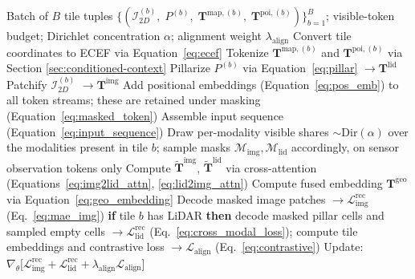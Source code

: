 \documentclass{book}
\begin{document}
\begin{algorithm}[H]
  \caption{GFM Pre-training Step (single batch)}
  \label{alg:pretraining}
  \begin{algorithmic}[1]
    \Require Batch of $B$ tile tuples
      $\{(\mathcal{I}^{(b)}_{2D},\;
          P^{(b)},\;
          \mathbf{T}^{\text{map},(b)},\;
          \mathbf{T}^{\text{poi},(b)})\}_{b=1}^B$;
      visible-token budget; Dirichlet concentration $\alpha$;
      alignment weight $\lambda_{\text{align}}$
      \State Convert tile coordinates to ECEF via
        Equation~\eqref{eq:ecef}
      \State Tokenize $\mathbf{T}^{\text{map},(b)}$ and
        $\mathbf{T}^{\text{poi},(b)}$ via
        Section \ref{sec:conditioned-context}
      \State Pillarize $P^{(b)}$ via
        Equation~\eqref{eq:pillar}
        $\to \mathbf{T}^{\text{lid}}$
      \State Patchify $\mathcal{I}^{(b)}_{2D}$
        $\to \mathbf{T}^{\text{img}}$
      \State Add positional embeddings
        (Equation~\eqref{eq:pos_emb}) to all token streams;
        these are retained under masking
        (Equation~\eqref{eq:masked_token})
      \State Assemble input sequence
        (Equation~\eqref{eq:input_sequence})
      \State Draw per-modality visible shares
        $\sim \mathrm{Dir}(\alpha)$ over the modalities present
        in tile $b$; sample masks
        $\mathcal{M}_{\text{img}}, \mathcal{M}_{\text{lid}}$
        accordingly, on sensor observation tokens only
      \State Compute $\widetilde{\mathbf{T}}^{\text{img}}$,
        $\widetilde{\mathbf{T}}^{\text{lid}}$ via
        cross-attention
        (Equations~\eqref{eq:img2lid_attn},
        \eqref{eq:lid2img_attn})
      \State Compute fused embedding $\mathbf{T}^{\text{geo}}$
        via Equation~\eqref{eq:geo_embedding}
      \State Decode masked image patches
        $\to \mathcal{L}^{\text{rec}}_{\text{img}}$
        (Eq.~\eqref{eq:mae_img})
      \State \textbf{if} tile $b$ has LiDAR \textbf{then}
        decode masked pillar cells and sampled empty cells
        $\to \mathcal{L}^{\text{rec}}_{\text{lid}}$
        (Eq.~\eqref{eq:cross_modal_loss});
        compute tile embeddings and contrastive loss
        $\to \mathcal{L}_{\text{align}}$
        (Eq.~\eqref{eq:contrastive})
    \EndFor
    \State Update:
      $\nabla_\theta\bigl[
        \mathcal{L}^{\text{rec}}_{\text{img}}
        + \mathcal{L}^{\text{rec}}_{\text{lid}}
        + \lambda_{\text{align}}\mathcal{L}_{\text{align}}
      \bigr]$
  \end{algorithmic}
\end{algorithm}
\end{document}
